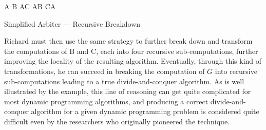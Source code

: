 \begin{algorithm}
\renewcommand\arraystretch{1.3}
\begin{algorithmic}
  \State A 
  \State B    
  \State A
  \State C    
  \State A
  \State B    
  \State C
  \State A
\EndProcedure
\end{algorithmic}
\caption{\label{intro:recursive-A}
   Simplified Arbiter --- Recursive Breakdown}
\end{algorithm}


Richard must then use the same strategy to further break down and
transform the computations of B and C, each into four recursive sub-computations, 
further improving the locality of the resulting algorithm.
Eventually, through this kind of transformations, he can succeed in breaking the computation of $G$ into recursive sub-computations leading to a true divide-and-conquer algorithm. 
As is well illustrated by the example, this line of reasoning can get quite complicated for most dynamic programming algorithms, 
and producing a correct divide-and-conquer algorithm for a given dynamic programming problem is considered quite difficult even by the researchers who originally pioneered the technique. 

